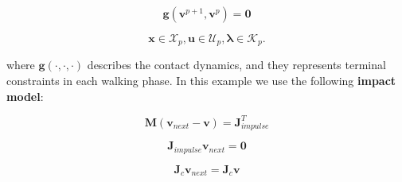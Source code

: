 $$ \mathbf{g}(\mathbf{v}^{p+1},\mathbf{v}^p) = \mathbf{0}$$

$$ \mathbf{x}\in\mathcal{X}_p, \mathbf{u}\in\mathcal{U}_p, \boldsymbol{\lambda}\in\mathcal{K}_p.$$

where $\mathbf{g}(\cdot,\cdot,\cdot)$ describes the contact dynamics, and they represents terminal constraints in each walking phase. In this example we use the following \textbf{impact model}:

$$\mathbf{M}(\mathbf{v}_{next}-\mathbf{v}) = \mathbf{J}_{impulse}^T$$

$$\mathbf{J}_{impulse} \mathbf{v}_{next} = \mathbf{0}$$

$$\mathbf{J}_{c} \mathbf{v}_{next} = \mathbf{J}_{c} \mathbf{v}$$



